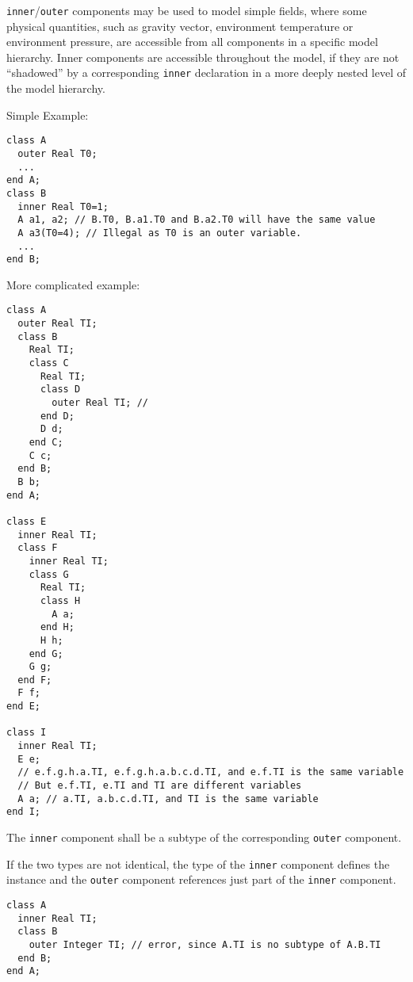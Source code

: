 \begin{nonnormative}
\lstinline!inner!/\lstinline!outer! components may be used to model simple fields, where some physical quantities, such as gravity vector, environment temperature or
environment pressure, are accessible from all components in a specific model hierarchy.  Inner components are accessible throughout the model, if they are not ``shadowed''
by a corresponding \lstinline!inner! declaration in a more deeply nested level of the model hierarchy.
\end{nonnormative}

\begin{example}
Simple Example:
\begin{lstlisting}[language=modelica]
class A
  outer Real T0;
  ...
end A;
class B
  inner Real T0=1;
  A a1, a2; // B.T0, B.a1.T0 and B.a2.T0 will have the same value
  A a3(T0=4); // Illegal as T0 is an outer variable.
  ...
end B;
\end{lstlisting}
More complicated example:
\begin{lstlisting}[language=modelica]
class A
  outer Real TI;
  class B
    Real TI;
    class C
      Real TI;
      class D
        outer Real TI; //
      end D;
      D d;
    end C;
    C c;
  end B;
  B b;
end A;

class E
  inner Real TI;
  class F
    inner Real TI;
    class G
      Real TI;
      class H
        A a;
      end H;
      H h;
    end G;
    G g;
  end F;
  F f;
end E;

class I
  inner Real TI;
  E e;
  // e.f.g.h.a.TI, e.f.g.h.a.b.c.d.TI, and e.f.TI is the same variable
  // But e.f.TI, e.TI and TI are different variables
  A a; // a.TI, a.b.c.d.TI, and TI is the same variable
end I;
\end{lstlisting}
\end{example}

The \lstinline!inner! component shall be a subtype of the corresponding \lstinline!outer! component.

\begin{nonnormative}
If the two types are not identical, the type of the \lstinline!inner! component defines the instance and the \lstinline!outer! component references just part of the
\lstinline!inner! component.
\end{nonnormative}

\begin{example}
\begin{lstlisting}[language=modelica]
class A
  inner Real TI;
  class B
    outer Integer TI; // error, since A.TI is no subtype of A.B.TI
  end B;
end A;
\end{lstlisting}
\end{example}

